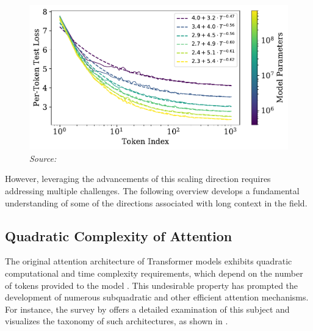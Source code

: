 \begin{figure}[ht]
    \centering
    \includegraphics[width=\textwidth]{figures/context-power-law.pdf}
    \label{fig:context-power-law}
    \hfill\textit{Source: \citet{kaplan2020}}
\end{figure}

However, leveraging the advancements of this scaling direction requires addressing multiple challenges. The following overview develops a fundamental understanding of some of the directions associated with long context in the field.

\subsection{Quadratic Complexity of Attention}

The original attention architecture of Transformer models exhibits quadratic computational and time complexity requirements, which depend on the number of tokens provided to the model \parencite{vaswani2017}. This undesirable property has prompted the development of numerous subquadratic and other efficient attention mechanisms. For instance, the survey by \citet{tay2022} offers a detailed examination of this subject and visualizes the taxonomy of such architectures, as shown in .

